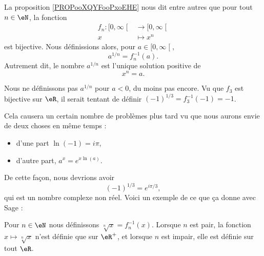 \begin{definition}        \label{DEFooJWQLooWkOBxQ}
    La proposition \ref{PROPooXQYFooPxoEHE} nous dit entre autres que pour tout \( n\in \eN\), la fonction
    \begin{equation}
        \begin{aligned}
            f_n\colon \mathopen[ 0 , \infty \mathclose[&\to \mathopen[ 0 , \infty \mathclose[ \\
            x&\mapsto x^n 
        \end{aligned}
    \end{equation}
    est bijective. Nous définissions alors, pour \( a\in \mathopen[ 0 , \infty \mathclose[\),
    \begin{equation}
        a^{1/n}=f_n^{-1}(a).
    \end{equation}
    Autrement dit, le nombre \( a^{1/n}\) est l'unique solution positive de
    \begin{equation}
        x^n=a.
    \end{equation}
\end{definition}

\begin{normaltext}      \label{NORMooDUNZooUNdUKg}
    Nous ne définissons pas \( a^{1/n}\) pour \( a<0\), du moins pas encore. Vu que \( f_3\) est bijective sur \( \eR\), il serait tentant de définir \( (-1)^{1/3}=f_3^{-1}(-1)=-1\).

    Cela causera un certain nombre de problèmes plus tard vu que nous aurons envie de deux choses en même temps :
    \begin{itemize}
        \item d'une part \( \ln(-1)=i\pi\),
        \item d'autre part, \( a^x= e^{x\ln(a)}\).
    \end{itemize}
    De cette façon, nous devrions avoir
    \begin{equation}
        (-1)^{1/3}= e^{i\pi /3},
    \end{equation}
    qui est un nombre complexe non réel. Voici un exemple de ce que ça donne avec Sage :
    
\end{normaltext}

\begin{definition}[Racince]     \label{DEFooPOELooPouwtD}
    Pour \( n\in \eN\) nous définissons \( \sqrt[n]{ x }=f_n^{-1}(x)\). Lorsque \( n\) est pair, la fonction \( x\mapsto\sqrt[n]{ x }\) n'est définie que sur \( \eR^+\), et lorsque \( n\) est impair, elle est définie sur tout \( \eR\).
\end{definition}

